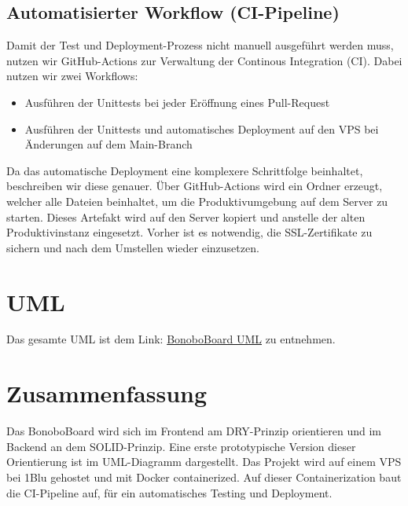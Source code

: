 \documentclass[a4paper,11pt]{scrartcl}
\begin{document}
	\subsection{Automatisierter Workflow (CI-Pipeline)} \label{ci}
Damit der Test und Deployment-Prozess nicht manuell ausgeführt werden muss, nutzen wir GitHub-Actions zur Verwaltung der Continous Integration (CI).
Dabei nutzen wir zwei Workflows:
\begin{itemize}
	\item Ausführen der Unittests bei jeder Eröffnung eines Pull-Request
	\item Ausführen der Unittests und automatisches Deployment auf den VPS bei Änderungen auf dem Main-Branch
\end{itemize}
Da das automatische Deployment eine komplexere Schrittfolge beinhaltet, beschreiben wir diese genauer.
Über GitHub-Actions wird ein Ordner erzeugt, welcher alle Dateien beinhaltet, um die Produktivumgebung auf dem Server zu starten. Dieses Artefakt wird auf den Server kopiert und anstelle der alten Produktivinstanz eingesetzt. Vorher ist es notwendig, die SSL-Zertifikate zu sichern und nach dem Umstellen wieder einzusetzen.

\section{UML}
Das gesamte UML ist dem Link: \href{https://raw.githubusercontent.com/Software-Engineering-DHBW/BonoboBoard/main/documents/img/BonoboUML.drawio.svg}{BonoboBoard UML} zu entnehmen. 

\section{Zusammenfassung}
Das BonoboBoard wird sich im Frontend am DRY-Prinzip orientieren und im Backend an dem SOLID-Prinzip.
Eine erste prototypische Version dieser Orientierung ist im UML-Diagramm dargestellt.
Das Projekt wird auf einem VPS bei 1Blu gehostet und mit Docker \textquotedbl containerized\textquotedbl.
Auf dieser \textquotedbl Containerization\textquotedbl{} baut die CI-Pipeline auf, für ein automatisches Testing
und Deployment.


\end{document}

